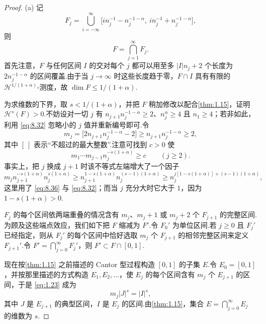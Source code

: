 \begin{proof}
(a) 记
\begin{equation}\label{eq:8.34}
  F_j=\bigcup_{i=-\infty}^{\infty}\bigl[i n_j^{-1}-n_j^{-1-\alpha},\ i n_j^{-1}+n_j^{-1-\alpha}\bigr],
\end{equation}
则
\begin{equation}\label{eq:8.35}
  F=\bigcap_{j=1}^{\infty}F_j.
\end{equation}
首先注意，$F$ 与任何区间 $I$ 的交对每个 $j$ 都可以用至多 $|I|n_j+2$ 个长度为 $2n_j^{-1-\alpha}$ 的区间覆盖.由于当 $j\to\infty$ 时这些长度趋于零，$F\cap I$ 具有有限的 $\mathcal{H}^{1/(1+\alpha)}$-测度，故 $\dim F\leq 1/(1+\alpha)$.

为求维数的下界，取 $s<1/(1+\alpha)$，并把 $F$ 稍加修改以配合\cref{thm:1.15}，证明 $\mathcal{H}^s(F)>0$.不妨设对一切 $j$ 有 $n_{j+1}n_j^{-1-\alpha}\geq 2$、$n_j^{\alpha}\geq 4$ 且 $n_1\geq 4$；若非如此，利用 \eqref{eq:8.32} 忽略小的 $j$ 值并重新编号即可.令
\begin{equation}\label{eq:8.36}
  m_j=\bigl[2n_{j+1}n_j^{-1-\alpha}-2\bigr]\geq n_{j+1}n_j^{-1-\alpha}\geq 2,
\end{equation}
其中 $[\ ]$ 表示``不超过的最大整数''.注意可找到 $c>0$ 使
\begin{equation}\label{eq:8.37}
  m_1\cdots m_{j-1}n_j^{-s(1+\alpha)}\geq c\qquad(j\geq 2).
\end{equation}
事实上，把 $j$ 换成 $j+1$ 时该不等式左端增大了一个因子
\[
  m_j n_{j+1}^{-s(1+\alpha)}n_j^{s(1+\alpha)}
  \geq n_{j+1}^{1-s(1+\alpha)}n_j^{(s-1)(1+\alpha)}
  \geq n_j^{j[1-s(1+\alpha)]+(s-1)(1+\alpha)},
\]
这里用了 \eqref{eq:8.36} 与 \eqref{eq:8.32}；而当 $j$ 充分大时它大于 $1$，因为 $1-s(1+\alpha)>0$.

$F_j$ 的每个区间依两端重叠的情况含有 $m_j$、$m_j+1$ 或 $m_j+2$ 个 $F_{j+1}$ 的完整区间.为顾及这些端点效应，我们如下把 $F$ 缩减为 $F'$.令 $F_0'$ 为单位区间.若 $j\geq 0$ 且 $F_j'$ 已经指定，则从 $F_j'$ 的每个区间中恰好选取 $m_j$ 个 $F_{j+1}$ 的相邻完整区间来定义 $F_{j+1}'$.令 $F'=\bigcap_{j=0}^{\infty}F_j'$，则 $F'\subset F\cap[0,1]$.

现在按\cref{thm:1.15} 之前描述的 Cantor 型过程构造 $[0,1]$ 的子集 $E$.令 $E_0=[0,1]$，并按那里描述的方式构造 $E_1,E_2,\ldots$，使 $E_j$ 的每个区间含有 $m_j$ 个 $E_{j+1}$ 的区间，于是 \eqref{eq:1.23} 成为
\begin{equation}\label{eq:8.38}
  m_j|J|^{s}=|I|^{s},
\end{equation}
其中 $J$ 是 $E_{j+1}$ 的典型区间，$I$ 是 $E_j$ 的区间.由\cref{thm:1.15}，集合 $E=\bigcap_{j=0}^{\infty}E_j$ 的维数为 $s$.


\end{proof}
